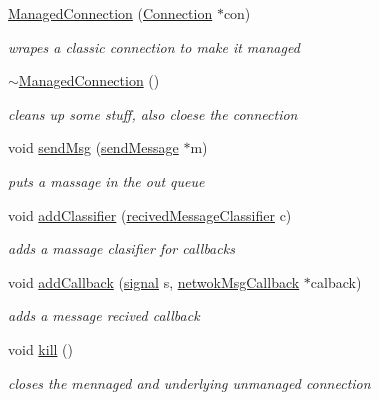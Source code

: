 \begin{DoxyCompactItemize}
\item 
\hyperlink{classllu_1_1network_1_1_managed_connection_a799a62f147762b2c4992ce91f06ff451}{Managed\+Connection} (\hyperlink{classllu_1_1network_1_1_connection}{Connection} $\ast$con)
\begin{DoxyCompactList}\small\item\em wrapes a classic connection to make it managed \end{DoxyCompactList}\item 
\hyperlink{classllu_1_1network_1_1_managed_connection_ab2740d022d8af2679b76e3b7c097909c}{$\sim$\+Managed\+Connection} ()
\begin{DoxyCompactList}\small\item\em cleans up some stuff, also cloese the connection \end{DoxyCompactList}\item 
void \hyperlink{classllu_1_1network_1_1_managed_connection_a464e40505c93ce769dacf381a6e0e503}{send\+Msg} (\hyperlink{structllu_1_1network_1_1send_message}{send\+Message} $\ast$m)
\begin{DoxyCompactList}\small\item\em puts a massage in the out queue \end{DoxyCompactList}\item 
void \hyperlink{classllu_1_1network_1_1_managed_connection_a5bce6d60a66c9dc660b3cd20479830c9}{add\+Classifier} (\hyperlink{namespacellu_1_1network_ac629c1180a0bee8ddef541f73cb3e5f9}{recived\+Message\+Classifier} c)
\begin{DoxyCompactList}\small\item\em adds a massage clasifier for callbacks \end{DoxyCompactList}\item 
void \hyperlink{classllu_1_1network_1_1_managed_connection_a1348765635cc1e53340dc94c5879a4c6}{add\+Callback} (\hyperlink{namespacellu_1_1callback_a082ed24306809c4d250bd5ddfbae177f}{signal} s, \hyperlink{namespacellu_1_1network_a999d34263abe84a87d12271383c606b9}{netwok\+Msg\+Callback} $\ast$calback)
\begin{DoxyCompactList}\small\item\em adds a message recived callback \end{DoxyCompactList}\item 
void \hyperlink{classllu_1_1network_1_1_managed_connection_a04c4198e03082243885c058d7e703e8e}{kill} ()
\begin{DoxyCompactList}\small\item\em closes the mennaged and underlying unmanaged connection \end{DoxyCompactList}\item 

\end{DoxyCompactItemize}
